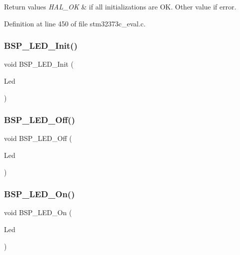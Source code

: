 \begin{DoxyRetVals}{Return values}
{\em H\+A\+L\+\_\+\+OK} & if all initializations are OK. Other value if error. \\
\hline
\end{DoxyRetVals}


Definition at line 450 of file stm32373c\+\_\+eval.\+c.

\mbox{\label{group___exported___functions_gab58a4f16a476a53653c5c400e3bed158}} 
\subsubsection{B\+S\+P\+\_\+\+L\+E\+D\+\_\+\+Init()}
{\footnotesize\ttfamily void B\+S\+P\+\_\+\+L\+E\+D\+\_\+\+Init (\begin{DoxyParamCaption}\item[{\textbf{ Led\+\_\+\+Type\+Def}}]{Led }\end{DoxyParamCaption})}

\mbox{\label{group___exported___functions_gaef268680154ca15c45066d64d41f9467}} 
\subsubsection{B\+S\+P\+\_\+\+L\+E\+D\+\_\+\+Off()}
{\footnotesize\ttfamily void B\+S\+P\+\_\+\+L\+E\+D\+\_\+\+Off (\begin{DoxyParamCaption}\item[{\textbf{ Led\+\_\+\+Type\+Def}}]{Led }\end{DoxyParamCaption})}

\mbox{\label{group___exported___functions_gaee9c16b16384834c69efabf58f423d6f}} 
\subsubsection{B\+S\+P\+\_\+\+L\+E\+D\+\_\+\+On()}
{\footnotesize\ttfamily void B\+S\+P\+\_\+\+L\+E\+D\+\_\+\+On (\begin{DoxyParamCaption}\item[{\textbf{ Led\+\_\+\+Type\+Def}}]{Led }\end{DoxyParamCaption})}

